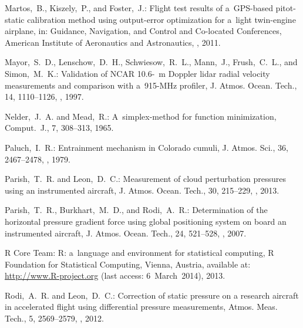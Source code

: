 \documentclass[amtd, online, hvmath]{copernicus}
\begin{document}
\begin{thebibliography}{30}
Martos,~B., Kiszely,~P., and Foster,~J.: {Flight test results of
  a~GPS-based pitot-static calibration method using output-error
  optimization for a~light twin-engine airplane}, in: {Guidance, Navigation, and
Control and Co-located Conferences}, American Institute of Aeronautics and Astronautics, , 2011.


Mayor,~S.~D., Lenschow,~D.~H., Schwiesow,~R.~L., Mann,~J., Frush,~C.~L., and Simon,~M.~K.:
{Validation of NCAR 10.6-\unit{{\mu}m}  Doppler lidar radial velocity measurements
and comparison with a~915-MHz profiler}, {J. Atmos. Ocean. Tech.}, {14}, {1110--1126}, , {1997}.


Nelder,~J.~A. and Mead,~R.: {A~simplex-method for function minimization}, {Comput.~J.}, {7}, {308--313}, {1965}.


Paluch,~I.~R.: {Entrainment mechanism in Colorado cumuli}, {J. Atmos. Sci.}, {36}, {2467--2478}, , {1979}.


Parish,~T.~R. and Leon,~D.~C.: {Measurement of cloud perturbation pressures using
an instrumented aircraft}, {J. Atmos. Ocean. Tech.}, {30}, {215--229}, , {2013}.


Parish,~T.~R., Burkhart,~M.~D., and Rodi,~A.~R.: {Determination of the horizontal
pressure gradient force using global positioning system on board an instrumented aircraft},
{J. Atmos. Ocean. Tech.}, {24}, {521--528}, , {2007}.


{{R Core Team}}: {R: a~language and environment for statistical
  computing}, R Foundation for Statistical Computing, Vienna, Austria,
available at: \url{http://www.R-project.org} (last access: 6~March~2014), 2013.


 Rodi,~A.~R. and Leon,~D.~C.: Correction of static pressure on a
 research aircraft in accelerated flight using differential pressure
 measurements, Atmos. Meas. Tech., 5, 2569--2579,
 , 2012.



\end{thebibliography}
\end{document}
